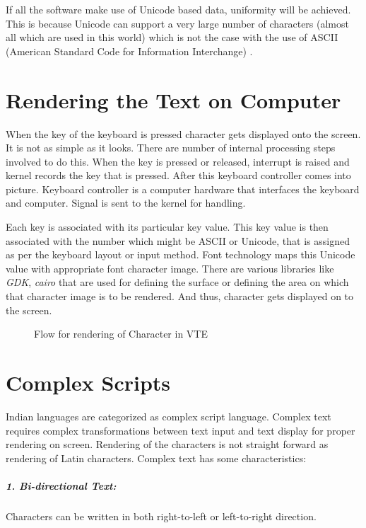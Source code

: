 If all the software make use of Unicode based data, uniformity will be achieved. This is because Unicode can support a very large number of characters (almost all which are used in this world) which is not the case with the use of ASCII (American Standard Code for Information Interchange) \cite{wiki5} .
		
\section{Rendering the Text on Computer}
When the key of the keyboard is pressed character gets displayed onto the screen. It is not as  simple as it looks. There are number of internal processing steps involved to do this. When the  key is pressed or released, interrupt is raised and kernel records the key that is pressed. After this keyboard controller comes into picture. Keyboard controller is a computer hardware that interfaces the keyboard and computer. Signal is sent to the kernel for handling.

Each key is associated with its particular key value. This key value is then associated with the number which might be ASCII or Unicode, that is assigned as per the keyboard layout or input method. Font technology maps this Unicode value with appropriate font character image. There are various libraries like \textit{GDK}, \textit{cairo} that are used for defining the surface or defining the area on which that character image is to be rendered. And thus, character gets displayed on to the screen.

\begin{figure}[htbp]
\centerline{}
\caption{Flow for rendering of Character in VTE} \label{Gnome Terminal1}
\end{figure}

\section{Complex Scripts}
Indian languages are categorized as complex script language. Complex text requires complex transformations between text input and text display for proper rendering on screen. Rendering of the characters is not straight forward as rendering of Latin characters. Complex text has some characteristics:

\subparagraph{1. Bi-directional Text:}
Characters can be written in both right-to-left or left-to-right direction.


